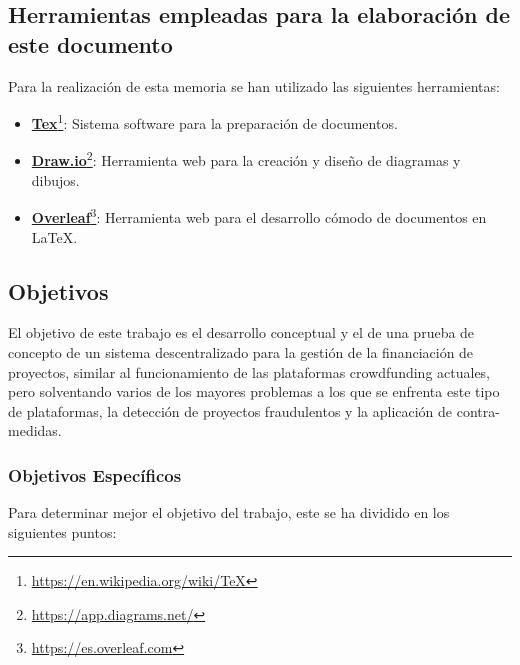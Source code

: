 \subsection{Herramientas empleadas para la elaboración de este documento}

Para la realización de esta memoria se han utilizado las siguientes herramientas:

\begin{itemize}
    \item \textcolor{blue}{\href{https://en.wikipedia.org/wiki/TeX}{\textbf{Tex}}}\footnote{\url{https://en.wikipedia.org/wiki/TeX}}: Sistema software para la preparación de documentos.
    
    \item \textcolor{blue}{\href{https://app.diagrams.net/}{\textbf{Draw.io}}}\footnote{\url{https://app.diagrams.net/}}: Herramienta web para la creación y diseño de diagramas y dibujos.

    \item \textcolor{blue}{\href{https://es.overleaf.com/}{\textbf{Overleaf}}}\footnote{\url{https://es.overleaf.com}}: Herramienta web para el  desarrollo cómodo de documentos en LaTeX.
\end{itemize}

\subsection{Objetivos}

El objetivo de este trabajo es el desarrollo conceptual y el de una prueba de concepto de un sistema descentralizado para la gestión de la financiación de proyectos, similar al funcionamiento de las plataformas crowdfunding\cite{crowdfunding} actuales, pero solventando varios de los mayores problemas a los que se enfrenta este tipo de plataformas, la detección de proyectos fraudulentos y la aplicación de contra-medidas.


\subsubsection{Objetivos Específicos}
Para determinar mejor el objetivo del trabajo, este se ha dividido en los siguientes puntos:

